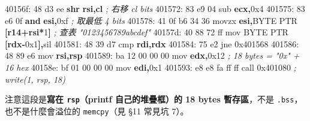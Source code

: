 \documentclass[10pt,a4paper]{article}
\newenvironment{Shaded}{\begin{snugshade}}{\end{snugshade}}
\newcommand{\BaseNTok}[1]{\textcolor[rgb]{0.00,0.00,0.81}{#1}}
\newcommand{\CommentTok}[1]{\textcolor[rgb]{0.56,0.35,0.01}{\textit{#1}}}
\newcommand{\DataTypeTok}[1]{\textcolor[rgb]{0.13,0.29,0.53}{#1}}
\newcommand{\DecValTok}[1]{\textcolor[rgb]{0.00,0.00,0.81}{#1}}
\newcommand{\FloatTok}[1]{\textcolor[rgb]{0.00,0.00,0.81}{#1}}
\newcommand{\KeywordTok}[1]{\textcolor[rgb]{0.13,0.29,0.53}{\textbf{#1}}}
\newcommand{\NormalTok}[1]{#1}
\newcommand{\OperatorTok}[1]{\textcolor[rgb]{0.81,0.36,0.00}{\textbf{#1}}}
\renewenvironment{Shaded}{%
  \def\FrameCommand{\fboxsep=3.2pt\colorbox{shadecolor}}%
  \MakeFramed{\advance\hsize-\width\FrameRestore\small}%
}{%
  \endMakeFramed
}
\renewenvironment{quote}{%
  \begin{mdframed}[linewidth=0pt,innerleftmargin=0pt,innerrightmargin=0pt,
    innerbottommargin=0pt,innertopmargin=0pt,skipabove=0.55em,skipbelow=0.55em,
    leftmargin=0.9em,rightmargin=0.4em,startcode={\color{quotebar}\vrule width 2.6pt},%
    endcode={}]%
  \itshape\color{black}%
}{%
  \end{mdframed}%
}
\begin{document}
\begin{Shaded}
\begin{Highlighting}[]
\NormalTok{  40156f: 48 d3 ee           }\OperatorTok{shr}  \KeywordTok{rsi}\OperatorTok{,}\KeywordTok{cl}           \CommentTok{; 右移 cl bits}
\NormalTok{  401572: 83 e9 }\DecValTok{04}\NormalTok{           sub  }\KeywordTok{ecx}\OperatorTok{,}\BaseNTok{0x4}
\NormalTok{  401575: 83 e6 }\FloatTok{0}\BaseNTok{f}           \OperatorTok{and}  \KeywordTok{esi}\OperatorTok{,}\BaseNTok{0xf}          \CommentTok{; 取最低 4 bits}
\NormalTok{  401578: 41 0f b6 }\DecValTok{34} \DecValTok{36}\NormalTok{     movzx }\KeywordTok{esi}\OperatorTok{,}\DataTypeTok{BYTE} \DataTypeTok{PTR} \OperatorTok{[}\KeywordTok{r14}\OperatorTok{+}\KeywordTok{rsi}\OperatorTok{*}\DecValTok{1}\OperatorTok{]}   \CommentTok{; 查表 "0123456789abcdef"}
\NormalTok{  40157d: 40 88 72 ff        mov  }\DataTypeTok{BYTE} \DataTypeTok{PTR} \OperatorTok{[}\KeywordTok{rdx}\OperatorTok{{-}}\BaseNTok{0x1}\OperatorTok{],}\NormalTok{sil}
\NormalTok{  401581: 48 39 d7           cmp  }\KeywordTok{rdi}\OperatorTok{,}\KeywordTok{rdx}
\NormalTok{  401584: 75 e2              jne  }\BaseNTok{0x401568}
\NormalTok{  401586: 48 89 e6           mov  }\KeywordTok{rsi}\OperatorTok{,}\KeywordTok{rsp}
\NormalTok{  401589: ba }\DecValTok{12} \DecValTok{00} \DecValTok{00} \DecValTok{00}\NormalTok{     mov  }\KeywordTok{edx}\OperatorTok{,}\BaseNTok{0x12}         \CommentTok{; 18 bytes = "0x" + 16 hex}
\NormalTok{  40158e: bf }\DecValTok{01} \DecValTok{00} \DecValTok{00} \DecValTok{00}\NormalTok{     mov  }\KeywordTok{edi}\OperatorTok{,}\BaseNTok{0x1}
\NormalTok{  401593: e8 e8 fa ff ff     call }\BaseNTok{0x401080}         \CommentTok{; write(1, rsp, 18)}
\end{Highlighting}
\end{Shaded}

\begin{quote}
注意這段是\textbf{寫在 \texttt{rsp}（printf 自己的堆疊框）的 18 bytes
暫存區}，不是 \texttt{.\allowbreak{}bss}， 也不是什麼會溢位的 \texttt{memcpy}（見 §11
常見坑 7）。
\end{quote}
\end{document}
